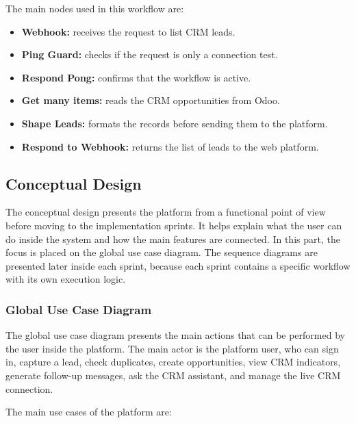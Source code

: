\documentclass[12pt,a4paper,oneside]{report}
\begin{document}
The main nodes used in this workflow are:

\begin{itemize}
\item \textbf{Webhook:} receives the request to list CRM leads.
\item \textbf{Ping Guard:} checks if the request is only a connection test.
\item \textbf{Respond Pong:} confirms that the workflow is active.
\item \textbf{Get many items:} reads the CRM opportunities from Odoo.
\item \textbf{Shape Leads:} formats the records before sending them to the platform.
\item \textbf{Respond to Webhook:} returns the list of leads to the web platform.
\end{itemize}

\subsection{Conceptual Design}\label{sumlbl:c2s2ss2}

The conceptual design presents the platform from a functional point of view before moving to the implementation sprints. It helps explain what the user can do inside the system and how the main features are connected. In this part, the focus is placed on the global use case diagram. The sequence diagrams are presented later inside each sprint, because each sprint contains a specific workflow with its own execution logic.

\subsubsection{Global Use Case Diagram}

The global use case diagram presents the main actions that can be performed by the user inside the platform. The main actor is the platform user, who can sign in, capture a lead, check duplicates, create opportunities, view CRM indicators, generate follow-up messages, ask the CRM assistant, and manage the live CRM connection.


The main use cases of the platform are:
\end{document}
